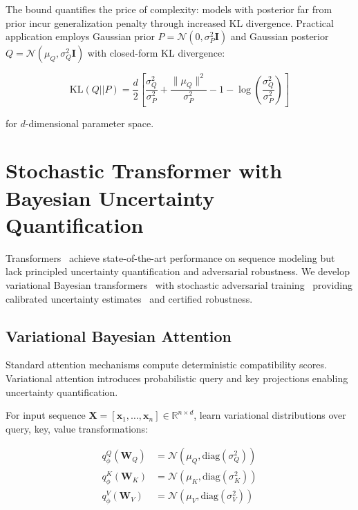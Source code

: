 The bound quantifies the price of complexity: models with posterior far from prior incur generalization penalty through increased KL divergence. Practical application employs Gaussian prior $P = \mathcal{N}(0, \sigma_P^2 \mathbf{I})$ and Gaussian posterior $Q = \mathcal{N}(\mu_Q, \sigma_Q^2 \mathbf{I})$ with closed-form KL divergence:

\begin{equation}
\text{KL}(Q||P) = \frac{d}{2}\left[\frac{\sigma_Q^2}{\sigma_P^2} + \frac{\|\mu_Q\|^2}{\sigma_P^2} - 1 - \log\left(\frac{\sigma_Q^2}{\sigma_P^2}\right)\right]
\end{equation}

for $d$-dimensional parameter space.

\section{Stochastic Transformer with Bayesian Uncertainty Quantification}
\label{sec:models_stochastic_transformer}

Transformers~\cite{vaswani2017attention} achieve state-of-the-art performance on sequence modeling but lack principled uncertainty quantification and adversarial robustness. We develop variational Bayesian transformers~\cite{blundell2015weight,kingma2014auto} with stochastic adversarial training~\cite{madry2018towards} providing calibrated uncertainty estimates~\cite{guo2017calibration} and certified robustness.



\subsection{Variational Bayesian Attention}

Standard attention mechanisms compute deterministic compatibility scores. Variational attention introduces probabilistic query and key projections enabling uncertainty quantification.

For input sequence $\mathbf{X} = [\mathbf{x}_1, \ldots, \mathbf{x}_n] \in \mathbb{R}^{n \times d}$, learn variational distributions over query, key, value transformations:

\begin{align}
q_\phi^Q(\mathbf{W}_Q) &= \mathcal{N}(\mu_Q, \text{diag}(\sigma_Q^2)) \\
q_\phi^K(\mathbf{W}_K) &= \mathcal{N}(\mu_K, \text{diag}(\sigma_K^2)) \\
q_\phi^V(\mathbf{W}_V) &= \mathcal{N}(\mu_V, \text{diag}(\sigma_V^2))
\end{align}

